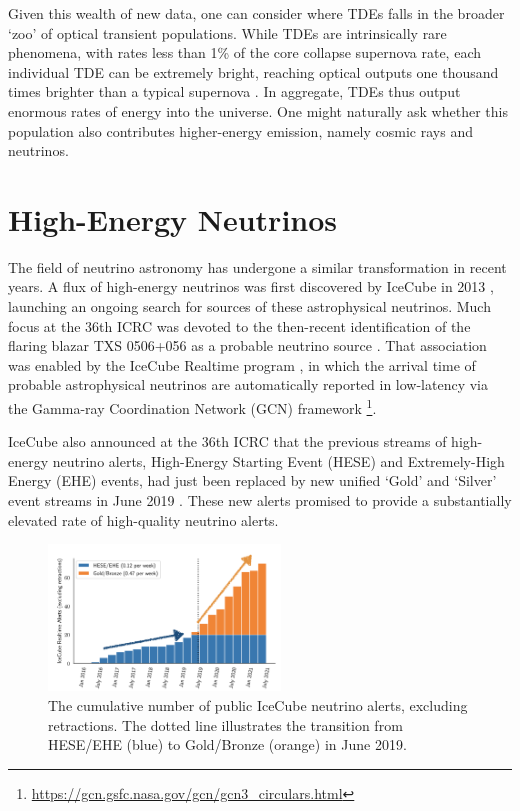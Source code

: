 \documentclass[a4paper,11pt]{article}
\begin{document}
Given this wealth of new data, one can consider where TDEs falls in the broader `zoo' of optical transient populations. 
While TDEs are intrinsically rare phenomena, with rates less than 1\% of the core collapse supernova rate, each individual TDE can be extremely bright, reaching optical outputs one thousand times brighter than a typical supernova \cite{fang_20}. In aggregate, TDEs thus output enormous rates of energy into the universe. One might naturally ask whether this population also contributes higher-energy emission, namely cosmic rays and neutrinos.

\section{High-Energy Neutrinos}

The field of neutrino astronomy has undergone a similar transformation in recent years. A flux of high-energy neutrinos was first discovered by IceCube in 2013 \cite{ic_astro_13}, launching an ongoing search for sources of these astrophysical neutrinos. Much focus at the 36th ICRC was devoted to the then-recent identification of the flaring blazar TXS 0506+056 as a probable neutrino source \cite{ic_txs_mm_18, kappes_19}. That association was enabled by the IceCube Realtime program \cite{ic_realtime_17}, in which the arrival time of probable astrophysical neutrinos are automatically reported in low-latency via the Gamma-ray Coordination Network (GCN) framework \footnote{\url{https://gcn.gsfc.nasa.gov/gcn/gcn3_circulars.html}}.

IceCube also announced at the 36th ICRC that the previous streams of high-energy neutrino alerts, High-Energy Starting Event (HESE) and Extremely-High Energy (EHE)  events, had just been replaced by new unified `Gold' and `Silver' event streams in June 2019 \cite{ic_realtime_19}. These new alerts promised to provide a substantially elevated rate of high-quality neutrino alerts. 

\begin{figure}[!ht]
	\centering \includegraphics[width=0.55\textwidth]{figures/ic_alerts}
	\caption{The cumulative number of public IceCube neutrino alerts, excluding retractions. The dotted line illustrates the transition from HESE/EHE (blue) to Gold/Bronze (orange) in June 2019.}
	\label{fig:ic_alerts}
\end{figure}
\end{document}
